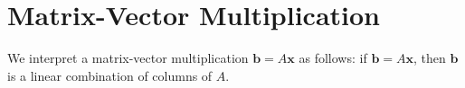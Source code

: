 \chapter{Matrix-Vector Multiplication}\label{chap:matrix-vector-multiplication}
We interpret a matrix-vector multiplication \(\mathbf{b}=A\mathbf{x}\) as follows: if \(\mathbf{b}=A\mathbf{x}\), then \(\mathbf{b}\) is a linear combination of columns of \(A\).